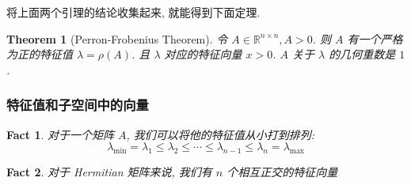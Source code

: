 \documentclass{article}
\newtheorem{fact}{Fact}
\newtheorem*{theorem}{Theorem}
\begin{document}
将上面两个引理的结论收集起来, 就能得到下面定理.
\begin{theorem}[Perron-Frobenius Theorem]
  令 $A\in\mathbb{R}^{n\times n}, A > 0$.
  则 $A$ 有一个严格为正的特征值 $\lambda = \rho(A)$.
  且 $\lambda$ 对应的特征向量 $x > 0$.
  $A$ 关于 $\lambda$ 的几何重数是 $1$.
\end{theorem}

\subsubsection{特征值和子空间中的向量}
\begin{fact}
  对于一个矩阵 $A$, 我们可以将他的特征值从小打到排列:
  \[\lambda_{\min} = \lambda_1 \leq \lambda_2 \leq \cdots \leq \lambda_{n-1} \leq \lambda_n = \lambda_{\max}\]
\end{fact}

\begin{fact}
  对于 Hermitian 矩阵来说,  我们有 $n$ 个相互正交的特征向量
\end{fact}
\end{document}
